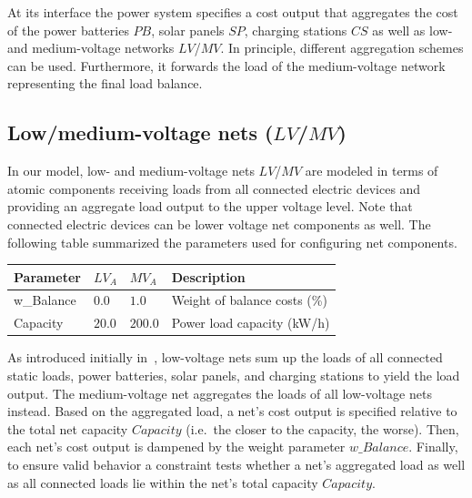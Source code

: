 At its interface the power system specifies a cost output that aggregates the cost of the power batteries $PB$, solar panels $SP$, charging stations $CS$ as well as low- and medium-voltage networks $LV$/$MV$. In principle, different aggregation schemes can be used. Furthermore, it forwards the load of the medium-voltage network representing the final load balance.

\subsection{Low/medium-voltage nets ($LV$/$MV$)}

In our model, low- and medium-voltage nets $LV$/$MV$ are modeled in terms of atomic components receiving loads from all connected electric devices and providing an aggregate load output to the upper voltage level. Note that connected electric devices can be lower voltage net components as well. The following table summarized the parameters used for configuring net components.

\begin{table}[h]
	\renewcommand{\arraystretch}{1.3}
	\centering
	\begin{tabularx}{\columnwidth}{lllX}
		\hline
		\textbf{Parameter}   & \textbf{$LV_{A}$} & \textbf{$MV_{A}$}  & Description \\ \hline
		w\_Balance       & $0.0$ & $1.0$ & Weight of balance costs (\%) \\  
		Capacity          & $20.0$ & $200.0$ & Power load capacity (kW/h)     \\ \hline
	\end{tabularx}
\end{table}

As introduced initially in~\cite{Hackenberg2012}, low-voltage nets sum up the loads of all connected static loads, power batteries, solar panels, and charging stations to yield the load output. The medium-voltage net aggregates the loads of all low-voltage nets instead. Based on the aggregated load, a net's cost output is specified relative to the total net capacity $Capacity$ (i.e.\ the closer to the capacity, the worse). Then, each net's cost output is dampened by the weight parameter $w\_Balance$. Finally, to ensure valid behavior a constraint tests whether a net's aggregated load as well as all connected loads lie within the net's total capacity $Capacity$.

